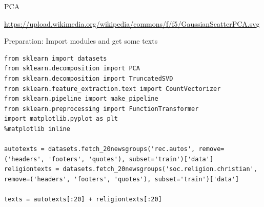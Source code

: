 \documentclass[compress]{beamer}
\begin{document}
\begin{frame}{PCA}

\tiny{\url{https://upload.wikimedia.org/wikipedia/commons/f/f5/GaussianScatterPCA.svg}}
\end{frame}



\begin{frame}{Preparation: Import modules and get some texts}
\begin{lstlisting}
from sklearn import datasets
from sklearn.decomposition import PCA
from sklearn.decomposition import TruncatedSVD
from sklearn.feature_extraction.text import CountVectorizer
from sklearn.pipeline import make_pipeline
from sklearn.preprocessing import FunctionTransformer
import matplotlib.pyplot as plt
%matplotlib inline

autotexts = datasets.fetch_20newsgroups('rec.autos', remove=('headers', 'footers', 'quotes'), subset='train')['data']
religiontexts = datasets.fetch_20newsgroups('soc.religion.christian', remove=('headers', 'footers', 'quotes'), subset='train')['data']

texts = autotexts[:20] + religiontexts[:20]
\end{lstlisting}
\end{frame}
\end{document}
